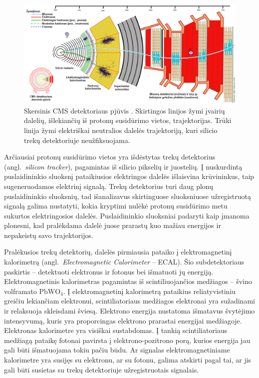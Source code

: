 \documentclass[a4paper, 12pt, oneside]{article}
\begin{document}
\begin{figure}[!t]
	\includegraphics[width=\textwidth]{CMSslice_LT.png}
	\caption{\label{fig:CMSslice}Skersinis CMS detektoriaus pjūvis \cite{CMSslice}.
	Skirtingos linijos žymi įvairių dalelių, išlekiančių iš protonų susidūrimo vietos, trajektorijas.
	Trūki linija žymi elektriškai neutralios dalelės trajektoriją, kuri silicio trekų detektoriuje
	neužfiksuojama.}
\end{figure}

Arčiausiai protonų susidūrimo vietos yra išdėstytas trekų detektorius (angl.\ \textit{silicon tracker}),
pagamintas iš silicio pikselių ir juostelių.
Į nuskurdintą puslaidininkio sluoksnį pataikiusios elektringos dalelės išlaisvina krūvininkus, taip sugeneruodamos
elektrinį signalą.
Trekų detektorius turi daug plonų puslaidininkio sluoksnių, tad išanalizavus skirtinguose sluoksniuose užregistruotą
signalą galima nustatyti, kokia kryptimi nulėkė protonų susidūrimo metu sukurtos elektringosios dalelės.
Puslaidininkio sluoksniai padaryti kaip įmanoma plonesni, kad pralėkdama dalelė juose prarastų kuo mažiau energijos
ir nepakeistų savo trajektorijos.

Pralėkusios trekų detektorių, dalelės pirmiausia pataiko į elektromagnetinį kalorimetrą (angl.\ \textit{Electromagnetic Calorimeter} -- ECAL).
Šio subdetektoriaus paskirtis -- detektuoti elektronus ir fotonus bei išmatuoti jų energiją.
Elektromagnetinis kalorimetras pagamintas iš scintiliuojančios medžiagos -- švino volframato $\mathrm{PbWO}_{4}$.
Į elektromagnetinį kalorimetrą pataikius reliatyvistiniu greičiu lekiančiam elektronui, scintiliatoriaus medžiagos elektronai yra sužadinami
ir relaksuoja skleisdami šviesą.
Elektrono energija nustatoma išmatavus švytėjimo intensyvumą, kuris yra proporcingas elektrono prarastai energijai medžiagoje.
Elektronas kalorimetre yra visiškai sustabdomas.
Į tankią scintiliatoriaus medžiagą pataikę fotonai pavirsta į elektrono-pozitrono porą, kurios energija jau gali būti išmatuojama
tokiu pačiu būdu.
Ar signalas elektromagnetiniame kalorimetre yra susijęs su elektronu, ar su fotonu, galima atskirti pagal tai, ar jis gali būti susietas su
trekų detektoriuje užregistruotais signalais.
\end{document}
